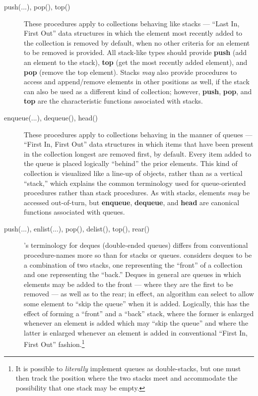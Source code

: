 \documentclass[12pt,letterpaper]{article}
\newcommand{\procitem}[1]{{#1}}
\newcommand{\dprocitem}[1]{{\color{black!60}\textbf{#1}}}
\newcommand{\lHGDM}{\resizebox{!}{8.5pt}{\ATexttclr{H}}%
\resizebox{!}{7.5pt}{\ATexttclr{GDM}}}
\newcommand{\ATexttclr}[1]{\textcolor{tcolor}{\textbf{#1}}}
\newcommand{\q}[1]{{\fontfamily{qcr}\selectfont ``}#1{\fontfamily{qcr}\selectfont ''}}
\begin{document}
{{\begin{description}
\item[\procitem{push(...)}, \procitem{pop()}, \procitem{top()}]  
These procedures apply to collections behaving like stacks 
--- \q{Last In, First Out} data structures in which the 
element most recently added to the collection is removed 
by default, when no other criteria for an element to 
be removed is provided.  All stack-like types should provide 
\dprocitem{push} (add an element to the stack), 
\dprocitem{top} (get the most recently added element), 
and \dprocitem{pop} (remove the top element).  Stacks 
\textit{may} also provide procedures to access and append/remove 
elements in other positions as well, if the stack can also 
be used as a different kind of collection; however, 
\dprocitem{push}, \dprocitem{pop}, and \dprocitem{top} 
are the characteristic functions associated with stacks.  

\item[\procitem{enqueue(...)}, \procitem{dequeue()}, \procitem{head()}]  
These procedures apply to collections behaving in the manner of queues 
--- \q{First In, First Out} data structures in which items 
that have been present in the collection longest are removed 
first, by default.  Every item added to the queue is placed 
logically \q{behind} the prior elements.  This kind of 
collection is visualized like a line-up of objects, rather 
than as a vertical \q{stack,} which explains the common 
terminology used for queue-oriented procedures rather than 
stack procedures.  As with stacks, elements \textit{may} 
be accessed out-of-turn, but \dprocitem{enqueue}, 
\dprocitem{dequeue}, and \dprocitem{head} are canonical 
functions associated with queues. 

\item[\procitem{push(...)}, 
\procitem{enlist(...)}, \procitem{pop()}, \procitem{delist()}, 
\procitem{top()}, \procitem{rear()}]  \lHGDM{}'s 
terminology for deques (double-\-end\-ed queues) 
differs from conventional procedure-names more so than 
for stacks or queues.  \lHGDM{} considers deques to be a 
combination of two stacks, one representing the \q{front} 
of a collection and one representing the \q{back.}  
Deques in general are queues in which elements may be 
added to the front --- where they are the first to be 
removed --- as well as to the rear; in effect, an algorithm 
can select to allow some element to \q{skip the queue} 
when it is added.  Logically, this has the effect of 
forming a \q{front} and a \q{back} stack, where the former 
is enlarged whenever an element is added which may 
\q{skip the queue} and where the latter is enlarged whenever an 
element is added in conventional \q{First In, First Out} 
fashion.\footnote{It is possible to \textit{literally} 
implement queues as double-stacks, but one must then 
track the position where the two stacks meet and accommodate 
the possibility that one stack may be empty.}


\end{description}}}
\end{document}
